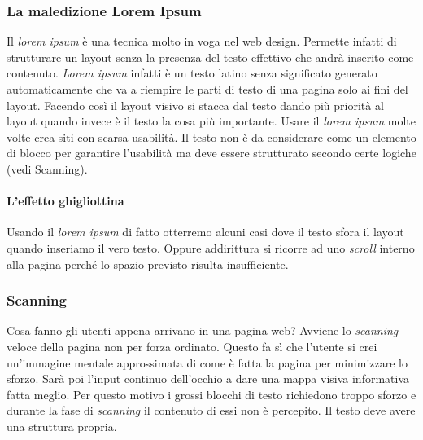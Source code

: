 			\subsubsection{La maledizione Lorem Ipsum}
				Il \emph{lorem ipsum} è una tecnica molto in voga nel web design. Permette infatti di strutturare un layout senza la presenza del testo effettivo che andrà inserito come contenuto. \emph{Lorem ipsum} infatti è un testo latino senza significato generato automaticamente che va a riempire le parti di testo di una pagina solo ai fini del layout.
				Facendo così il layout visivo si stacca dal testo dando più priorità al layout quando invece è il testo la cosa più importante. Usare il \emph{lorem ipsum} molte volte crea siti con scarsa usabilità.
				Il testo non è da considerare come un elemento di blocco per garantire l'usabilità ma deve essere strutturato secondo certe logiche (vedi Scanning).
				
				\paragraph{L'effetto ghigliottina}
					Usando il \emph{lorem ipsum} di fatto otterremo alcuni casi dove il testo sfora il layout quando inseriamo il vero testo. Oppure addirittura si ricorre ad uno \emph{scroll} interno alla pagina perché lo spazio previsto risulta insufficiente. 
				
			\subsubsection{Scanning}
				Cosa fanno gli utenti appena arrivano in una pagina web? Avviene lo \emph{scanning} veloce della pagina non per forza ordinato. Questo fa sì che l'utente si crei un'immagine mentale approssimata di come è fatta la pagina per minimizzare lo sforzo. Sarà poi l'input continuo dell'occhio a dare una mappa visiva informativa fatta meglio. Per questo motivo i grossi blocchi di testo richiedono troppo sforzo e durante la fase di \emph{scanning} il contenuto di essi non è percepito. Il testo deve avere una struttura propria.
			
